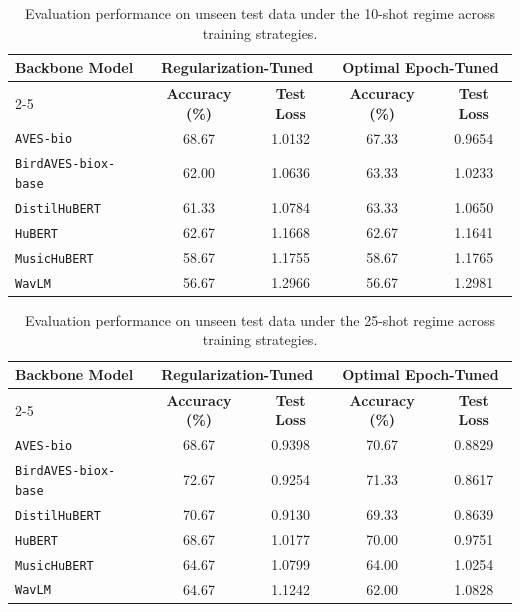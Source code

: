 \begin{table}[htbp]
\centering
\caption{Evaluation performance on unseen test data under the 10-shot regime across training strategies.}
\label{tab:eval_performance_10_shot}
\begin{tabular}{lcccc}
\hline
\textbf{Backbone Model} & \multicolumn{2}{c}{\textbf{Regularization-Tuned}} & \multicolumn{2}{c}{\textbf{Optimal Epoch-Tuned}} \\
\cline{2-5}
& \textbf{Accuracy (\%)} & \textbf{Test Loss} & \textbf{Accuracy (\%)} & \textbf{Test Loss} \\
\hline
\texttt{AVES-bio} & 68.67 & 1.0132 & 67.33 & 0.9654 \\
\texttt{BirdAVES-biox-base} & 62.00 & 1.0636 & 63.33 & 1.0233 \\
\texttt{DistilHuBERT} & 61.33 & 1.0784 & 63.33 & 1.0650 \\
\texttt{HuBERT} & 62.67 & 1.1668 & 62.67 & 1.1641 \\
\texttt{MusicHuBERT} & 58.67 & 1.1755 & 58.67 & 1.1765 \\
\texttt{WavLM} & 56.67 & 1.2966 & 56.67 & 1.2981 \\
\hline
\end{tabular}
\end{table}


\begin{table}[htbp]
\centering
\caption{Evaluation performance on unseen test data under the 25-shot regime across training strategies.}
\label{tab:eval_performance_25_shot}
\begin{tabular}{lcccc}
\hline
\textbf{Backbone Model} & \multicolumn{2}{c}{\textbf{Regularization-Tuned}} & \multicolumn{2}{c}{\textbf{Optimal Epoch-Tuned}} \\
\cline{2-5}
& \textbf{Accuracy (\%)} & \textbf{Test Loss} & \textbf{Accuracy (\%)} & \textbf{Test Loss} \\
\hline
\texttt{AVES-bio} & 68.67 & 0.9398 & 70.67 & 0.8829 \\
\texttt{BirdAVES-biox-base} & 72.67 & 0.9254 & 71.33 & 0.8617 \\
\texttt{DistilHuBERT} & 70.67 & 0.9130 & 69.33 & 0.8639 \\
\texttt{HuBERT} & 68.67 & 1.0177 & 70.00 & 0.9751 \\
\texttt{MusicHuBERT} & 64.67 & 1.0799 & 64.00 & 1.0254 \\
\texttt{WavLM} & 64.67 & 1.1242 & 62.00 & 1.0828 \\
\hline
\end{tabular}
\end{table}

